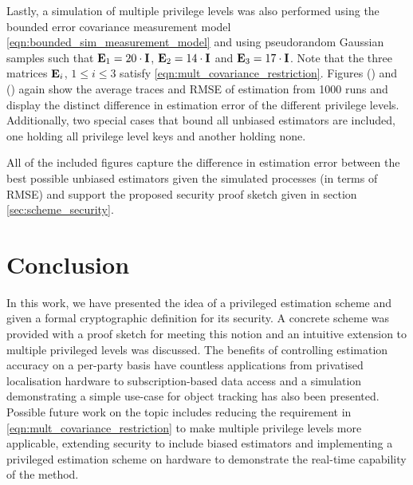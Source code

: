 \documentclass[letterpaper, 10 pt, conference]{IEEEtran}
\theoremstyle{definition}
\begin{document}

Lastly, a simulation of multiple privilege levels was also performed using the bounded error covariance measurement model \eqref{eqn:bounded_sim_measurement_model} and using pseudorandom Gaussian samples such that ${{\mathbf{E}}}_1=20 \cdot {\ensuremath{{\mathbf{I}}}}$, ${{\mathbf{E}}}_2=14 \cdot {\ensuremath{{\mathbf{I}}}}$ and ${{\mathbf{E}}}_3=17 \cdot {\ensuremath{{\mathbf{I}}}}$. Note that the three matrices ${{\mathbf{E}}}_i$, $1 \leq i \leq 3$ satisfy \eqref{eqn:mult_covariance_restriction}. Figures () and () again show the average traces and RMSE of estimation from 1000 runs and display the distinct difference in estimation error of the different privilege levels. Additionally, two special cases that bound all unbiased estimators are included, one holding all privilege level keys and another holding none.


All of the included figures capture the difference in estimation error between the best possible unbiased estimators given the simulated processes (in terms of RMSE) and support the proposed security proof sketch given in section \ref{sec:scheme_security}.

% 
%                                               
%                                               
%                                               
% 

\section{Conclusion}\label{sec:conclusion}
In this work, we have presented the idea of a privileged estimation scheme and given a formal cryptographic definition for its security. A concrete scheme was provided with a proof sketch for meeting this notion and an intuitive extension to multiple privileged levels was discussed. The benefits of controlling estimation accuracy on a per-party basis have countless applications from privatised localisation hardware to subscription-based data access and a simulation demonstrating a simple use-case for object tracking has also been presented. Possible future work on the topic includes reducing the requirement in \eqref{eqn:mult_covariance_restriction} to make multiple privilege levels more applicable, extending security to include biased estimators and implementing a privileged estimation scheme on hardware to demonstrate the real-time capability of the method.






\end{document}
